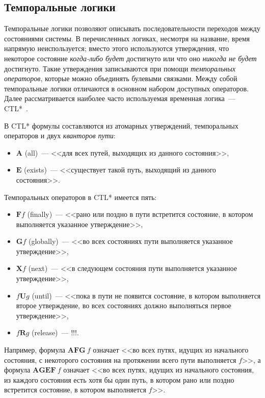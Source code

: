 \documentclass[a4paper,notitlepage,14pt]{article}
\begin{document}
\subsection{Темпоральные логики}
\label{sec:temporal-logics}

Темпоральные логики позволяют описывать последовательности переходов между состояниями
системы. В перечисленных логиках, несмотря на название, время напрямую неиспользуется;
вместо этого используются утверждения, что некоторое состояние \emph{когда-либо будет}
достигнуто или что оно \emph{никогда не будет} достигнуто. Такие утверждения записываются
при помощи \emph{темпоральных операторов}, которые можно объединять булевыми
связками. Между собой темпоральные логики отличаются в основном набором доступных
операторов. Далее рассматривается наиболее часто используемая временная логика~---
CTL*~\cite{Stirling96modaland}.

В CTL* формулы составляются из атомарных утверждений, темпоральных операторов и
двух \emph{кванторов пути}:

\begin{itemize}
\item $\mathbf{A}$ (all)~--- <<для всех путей, выходящих из данного состояния>>,
\item $\mathbf{E}$ (exists)~--- <<существует такой путь, выходящий из данного состояния>>.
\end{itemize}

Темпоральных операторов в CTL* имеется пять:

\begin{itemize}
\item $\mathbf{F} f$ (finally)~--- <<рано или поздно в пути встретится состояние, в котором
  выполняется указанное утверждение>>,
\item $\mathbf{G} f$ (globally)~--- <<во всех состояниях пути выполняется указанное
  утверждение>>,
\item $\mathbf{X} f$ (next)~--- <<в следующем состояния пути выполняется указанное
  утверждение>>,
\item $f \mathbf{U} g$ (until)~--- <<пока в пути не появится состояние, в котором выполняется
  второе утверждение, во всех состояниях должно выполняться первое утверждение>>,
\item $f \mathbf{R} g$ (release)~--- !!!.
\end{itemize}

Например, формула $\mathbf{AFG}~ f$ означает <<во всех путях, идущих из начального
состояния, с некоторого состояния на протяжении всего пути выполняется $f$>>, а формула
$\mathbf{AGEF}~ f$ означает <<во всех путях, идущих из начального состояния, из каждого
состояния есть хотя бы один путь, в котором рано или поздно встретится состояние, в
котором выполняется $f$>>.
\end{document}
